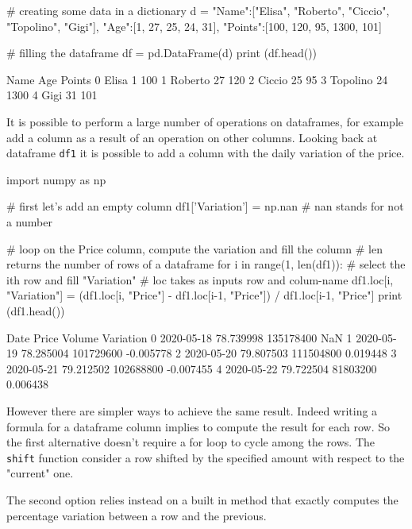 \begin{ipython}
# creating some data in a dictionary
d = {"Name":["Elisa", "Roberto", "Ciccio", "Topolino", "Gigi"],
	 "Age":[1, 27, 25, 24, 31],
	 "Points":[100, 120, 95, 1300, 101]}

# filling the dataframe
df = pd.DataFrame(d)
print (df.head())
\end{ipython}
\begin{ioutput}
       Name  Age     Points
0     Elisa    1        100
1   Roberto   27        120
2    Ciccio   25         95
3  Topolino   24       1300
4      Gigi   31        101
\end{ioutput}

It is possible to perform a large number of operations on dataframes, for example add a column as a result of an operation on other columns. 
Looking back at dataframe \texttt{df1} it is possible to add a column with the daily variation of the price.

\begin{ipython}
import numpy as np

# first let's add an empty column
df1['Variation'] = np.nan # nan stands for not a number

# loop on the Price column, compute the variation and fill the column
# len returns the number of rows of a dataframe
for i in range(1, len(df1)):
    # select the ith row and fill "Variation"
    # loc takes as inputs row and colum-name
    df1.loc[i, "Variation"] = (df1.loc[i, "Price"] - df1.loc[i-1, "Price"]) /
        df1.loc[i-1, "Price"]
print (df1.head())
\end{ipython}
\begin{ioutput}
        Date      Price     Volume  Variation
0 2020-05-18  78.739998  135178400        NaN
1 2020-05-19  78.285004  101729600  -0.005778
2 2020-05-20  79.807503  111504800   0.019448
3 2020-05-21  79.212502  102688800  -0.007455
4 2020-05-22  79.722504   81803200   0.006438	
\end{ioutput}
\noindent
However there are simpler ways to achieve the same result. Indeed writing a formula for a dataframe column implies to compute the result for each row. So the first alternative doesn't require a for loop to cycle among the rows. The \texttt{shift} function consider a row shifted by the specified amount with respect to the "current" one.

The second option relies instead on a built in method that exactly computes the percentage variation between a row and the previous.

